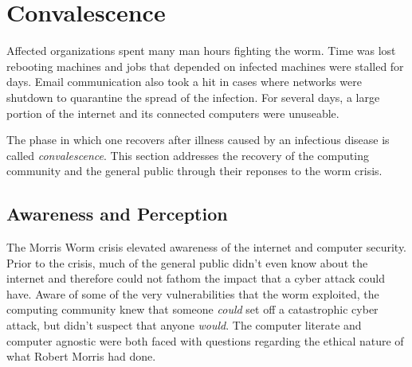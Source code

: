 \section*{Convalescence}

Affected organizations spent many man hours fighting the worm. Time was lost
rebooting machines and jobs that depended on infected machines were stalled for days.
Email communication also took a hit in cases where networks were shutdown to
quarantine the spread of the infection\cite{seeley_tour_1989}. For several days,
a large portion of the internet and its connected computers were unuseable.

The phase in which one recovers after illness caused by an infectious disease is
called \textit{convalescence}. This section addresses the recovery of the
computing community and the general public through their reponses to the worm
crisis.

\subsection*{Awareness and Perception}
The Morris Worm crisis elevated awareness of the internet and
computer security. Prior to the crisis, much of the general public didn't even
know about the internet and therefore could not fathom the impact that a
cyber attack could have. Aware of some of the very
vulnerabilities that the worm exploited, the computing community knew that
someone \textit{could} set off a catastrophic cyber attack, but didn't
suspect that anyone \textit{would}. The computer literate and computer agnostic
were both faced with questions regarding the ethical nature of what Robert
Morris had done.

